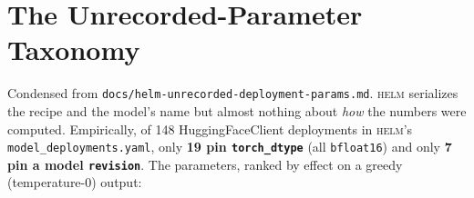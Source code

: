 \documentclass[11pt]{report}
\newcommand{\code}[1]{\texttt{#1}}
\newcommand{\file}[1]{\texttt{#1}}
\begin{document}
\chapter{The Unrecorded-Parameter Taxonomy}
\label{app:unrecorded}

Condensed from \file{docs/helm-unrecorded-deployment-params.md}. \textsc{helm}
serializes the recipe and the model's name but almost nothing about \emph{how} the
numbers were computed. Empirically, of 148 HuggingFaceClient deployments in
\textsc{helm}'s \code{model\_deployments.yaml}, only \textbf{19 pin
\code{torch\_dtype}} (all \code{bfloat16}) and only \textbf{7 pin a model
\code{revision}}. The parameters, ranked by effect on a greedy (temperature-0)
output:
\end{document}
